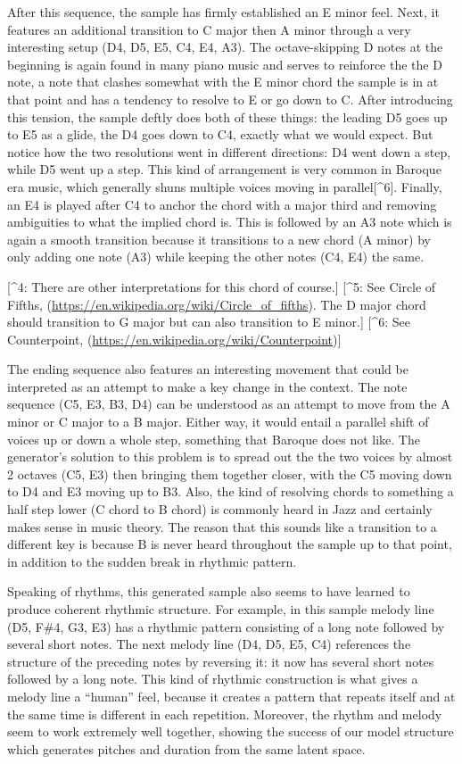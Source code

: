 \documentclass[12pt,oneside]{chicagocapstone}
\begin{document}
After this sequence, the sample has firmly established an E minor feel. Next, it features an additional transition to C major then A minor through a very interesting setup (D4, D5, E5, C4, E4, A3). The octave-skipping D notes at the beginning is again found in many piano music and serves to reinforce the the D note, a note that clashes somewhat with the E minor chord the sample is in at that point and has a tendency to resolve to E or go down to C. After introducing this tension, the sample deftly does both of these things: the leading D5 goes up to E5 as a glide, the D4 goes down to C4, exactly what we would expect. But notice how the two resolutions went in different directions: D4 went down a step, while D5 went up a step. This kind of arrangement is very common in Baroque era music, which generally shuns multiple voices moving in parallel{[}\^{}6{]}. Finally, an E4 is played after C4 to anchor the chord with a major third and removing ambiguities to what the implied chord is. This is followed by an A3 note which is again a smooth transition because it transitions to a new chord (A minor) by only adding one note (A3) while keeping the other notes (C4, E4) the same.

{[}\^{}4: There are other interpretations for this chord of course.{]}
{[}\^{}5: See Circle of Fifths, (\url{https://en.wikipedia.org/wiki/Circle_of_fifths}). The D major chord should transition to G major but can also transition to E minor.{]}
{[}\^{}6: See Counterpoint, (\url{https://en.wikipedia.org/wiki/Counterpoint}){]}

The ending sequence also features an interesting movement that could be interpreted as an attempt to make a key change in the context. The note sequence (C5, E3, B3, D4) can be understood as an attempt to move from the A minor or C major to a B major. Either way, it would entail a parallel shift of voices up or down a whole step, something that Baroque does not like. The generator's solution to this problem is to spread out the the two voices by almost 2 octaves (C5, E3) then bringing them together closer, with the C5 moving down to D4 and E3 moving up to B3. Also, the kind of resolving chords to something a half step lower (C chord to B chord) is commonly heard in Jazz and certainly makes sense in music theory. The reason that this sounds like a transition to a different key is because B is never heard throughout the sample up to that point, in addition to the sudden break in rhythmic pattern.

Speaking of rhythms, this generated sample also seems to have learned to produce coherent rhythmic structure. For example, in this sample melody line (D5, F\#4, G3, E3) has a rhythmic pattern consisting of a long note followed by several short notes. The next melody line (D4, D5, E5, C4) references the structure of the preceding notes by reversing it: it now has several short notes followed by a long note. This kind of rhythmic construction is what gives a melody line a ``human'' feel, because it creates a pattern that repeats itself and at the same time is different in each repetition. Moreover, the rhythm and melody seem to work extremely well together, showing the success of our model structure which generates pitches and duration from the same latent space.
\end{document}
